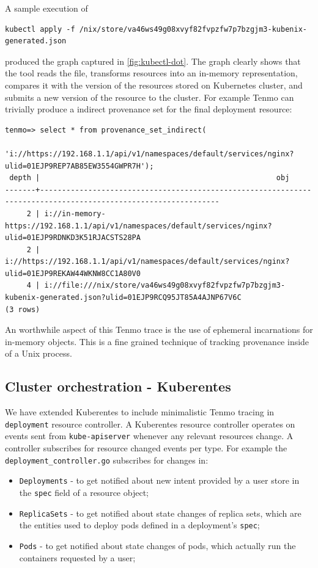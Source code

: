 A sample execution of
\begin{verbatim}
kubectl apply -f /nix/store/va46ws49g08xvyf82fvpzfw7p7bzgjm3-kubenix-generated.json
\end{verbatim}
produced the graph captured in \cref{fig:kubectl-dot}. The graph clearly shows that the tool reads the file, transforms resources into an in-memory representation, compares it with the version of the resources stored on Kubernetes cluster, and submits a new version of the resource to the cluster. For example Tenmo can trivially produce a indirect provenance set for the final deployment resource:
%
\begin{verbatim}
tenmo=> select * from provenance_set_indirect(
                  'i://https://192.168.1.1/api/v1/namespaces/default/services/nginx?ulid=01EJP9REP7AB85EW3554GWPR7H');
 depth |                                                      obj                                                      
-------+---------------------------------------------------------------------------------------------------------------
     2 | i://in-memory-https://192.168.1.1/api/v1/namespaces/default/services/nginx?ulid=01EJP9RDNKD3K51RJACSTS28PA
     2 | i://https://192.168.1.1/api/v1/namespaces/default/services/nginx?ulid=01EJP9REKAW44WKNW8CC1A80V0
     4 | i://file:///nix/store/va46ws49g08xvyf82fvpzfw7p7bzgjm3-kubenix-generated.json?ulid=01EJP9RCQ95JT85A4AJNP67V6C
(3 rows)
\end{verbatim}

An worthwhile aspect of this Tenmo trace is the use of ephemeral incarnations for in-memory objects. This is a fine grained technique of tracking provenance inside of a Unix process. 

\subsection{Cluster orchestration - Kuberentes}\label{sec:k8s-depl-controller}

We have extended Kuberentes to include minimalistic Tenmo tracing in \texttt{deployment} resource controller. A Kuberentes resource controller operates on events sent from \texttt{kube-apiserver} whenever any relevant resources change. A controller subscribes for resource changed events per type. For example the \texttt{deployment\_controller.go} subscribes for changes in:
%
\begin{itemize}
    \item \texttt{Deployments} - to get notified about new intent provided by a user store in the \texttt{spec} field of a resource object;
    \item \texttt{ReplicaSets} - to get notified about state changes of replica sets, which are the entities used to deploy pods defined in a deployment's \texttt{spec};
    \item \texttt{Pods} - to get notified about state changes of pods, which actually run the containers requested by a user;
\end{itemize}

